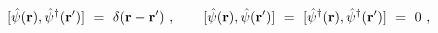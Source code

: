 \begin{equation}
\lbrack \hat{\psi}({\bf r}),\hat{\psi}^{\dagger }({\bf r^{\prime }})]\ =\
\delta ({\bf r}-{\bf r^{\prime }})\ ,\qquad \lbrack \hat{\psi}({\bf r}),\hat{%
\psi}({\bf r^{\prime }})]\ =\ [\hat{\psi}^{\dagger }({\bf r}),\hat{\psi}%
^{\dagger }({\bf r^{\prime }})]\ =\ 0\ ,  \label{comm1}
\end{equation}%
